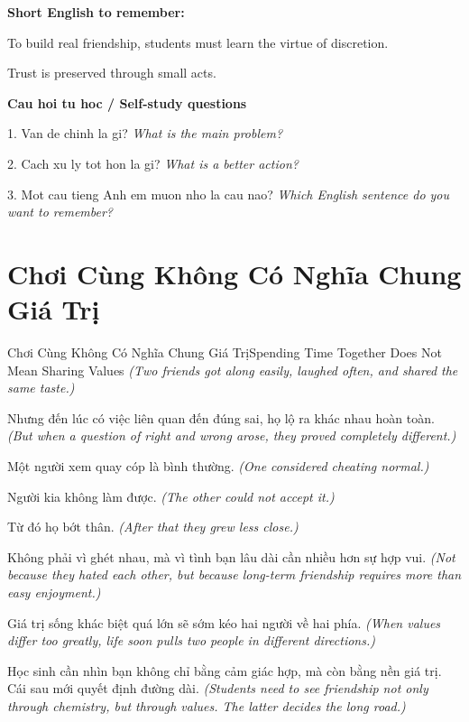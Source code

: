\begin{ghinhoanh}
\textbf{Short English to remember:}

To build real friendship, students must learn the virtue of discretion.

Trust is preserved through small acts.

\end{ghinhoanh}

\begin{tuhocnhanh}
\textbf{Cau hoi tu hoc / Self-study questions}

1. Van de chinh la gi? \textit{What is the main problem?}

2. Cach xu ly tot hon la gi? \textit{What is a better action?}

3. Mot cau tieng Anh em muon nho la cau nao? \textit{Which English sentence do you want to remember?}
\end{tuhocnhanh}
\ngancach

\section{Chơi Cùng Không Có Nghĩa Chung Giá Trị}
\begin{truyen}{Chơi Cùng Không Có Nghĩa Chung Giá Trị}{Spending Time Together Does Not Mean Sharing Values}
\textit{(Two friends got along easily, laughed often, and shared the same taste.)}

Nhưng đến lúc có việc liên quan đến đúng sai, họ lộ ra khác nhau hoàn toàn.
\textit{(But when a question of right and wrong arose, they proved completely different.)}

Một người xem quay cóp là bình thường.
\textit{(One considered cheating normal.)}

Người kia không làm được.
\textit{(The other could not accept it.)}

Từ đó họ bớt thân.
\textit{(After that they grew less close.)}

Không phải vì ghét nhau, mà vì tình bạn lâu dài cần nhiều hơn sự hợp vui.
\textit{(Not because they hated each other, but because long-term friendship requires more than easy enjoyment.)}

Giá trị sống khác biệt quá lớn sẽ sớm kéo hai người về hai phía.
\textit{(When values differ too greatly, life soon pulls two people in different directions.)}

\end{truyen}

\begin{baihoc}
Học sinh cần nhìn bạn không chỉ bằng cảm giác hợp, mà còn bằng nền giá trị. Cái sau mới quyết định đường dài.
\textit{(Students need to see friendship not only through chemistry, but through values. The latter decides the long road.)}
\end{baihoc}

